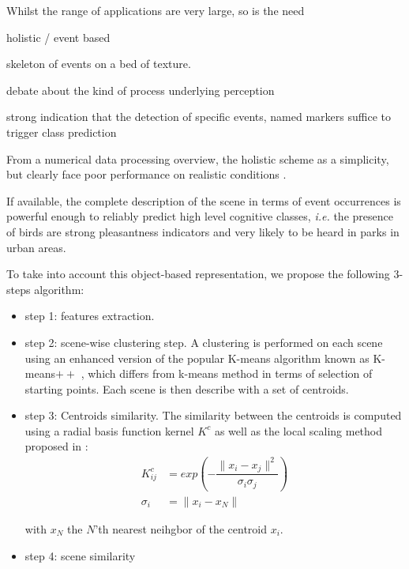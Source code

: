 \documentclass[journal]{IEEEtran}
\begin{document}

Whilst the range of applications are very large, so is the need

holistic / event based

skeleton of events on a bed of texture.

debate about the kind of process underlying perception

strong indication that the detection of specific events, named markers suffice to trigger class prediction

From a numerical data processing overview, the holistic scheme as a simplicity, but clearly face poor performance on realistic conditions \cite{lagrange:hal-01082501}.

If available, the complete description of the scene in terms of event occurrences is powerful enough to reliably predict high level cognitive classes, \textit{i.e.} the presence of birds are strong pleasantness indicators and very likely to be heard in parks in urban areas.

To take into account this object-based representation, we propose the following 3-steps algorithm:

\begin{itemize}
\item step 1: features extraction.
\item step 2: scene-wise clustering step. A clustering is performed on each scene using an enhanced version of the popular K-means algorithm known as K-means$++$ \cite{arthur2007k}, which differs from k-means method in terms of selection of starting points. Each scene is then describe with a set of centroids.
\item step 3: Centroids similarity. The similarity between the centroids is computed using a radial basis function kernel $K^c$ as well as the local scaling method proposed in \cite{selfTuneManor2004}: \\
\begin{equation}
\begin{split}
K^c_{ij} & =exp\left( - \dfrac{\parallel x_i - x_j \parallel^2}{\sigma_{i}\sigma_{j}} \right) \\
\sigma_{i} & =\parallel x_i - x_N \parallel
\end{split}
\end{equation}

with $x_N$ the $N$'th nearest neihgbor of the centroid $x_i$. \\

\item step 4: scene similarity \\
\end{itemize}
\end{document}
